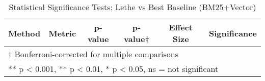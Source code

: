 \begin{table}[htbp]
\centering
\caption{Statistical Significance Tests: Lethe vs Best Baseline (BM25+Vector)}
\label{tab:key-comparisons}
\begin{tabular}{lccccl}
\toprule
Method & Metric & p-value & p-value† & Effect Size & Significance \\
\midrule
\bottomrule
\multicolumn{6}{l}{\small † Bonferroni-corrected for multiple comparisons} \\
\multicolumn{6}{l}{\small *** p < 0.001, ** p < 0.01, * p < 0.05, ns = not significant} \\
\end{tabular}
\end{table}
